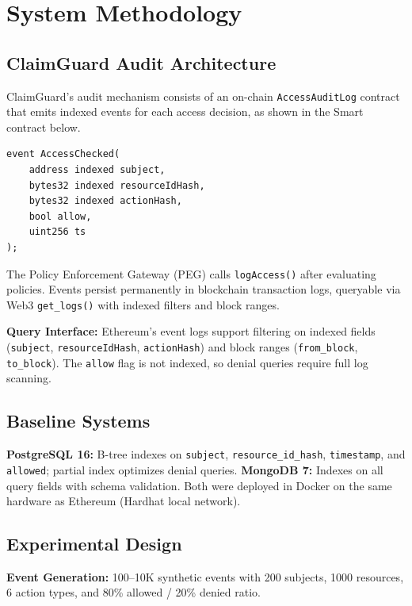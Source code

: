 \documentclass[conference]{IEEEtran}
\begin{document}
\section{System Methodology}

\subsection{ClaimGuard Audit Architecture}

ClaimGuard's audit mechanism consists of an on-chain \texttt{AccessAuditLog} contract that emits indexed events for each access decision, as shown in the Smart contract below.

\begin{lstlisting}[language=Solidity]
event AccessChecked(
    address indexed subject,
    bytes32 indexed resourceIdHash,
    bytes32 indexed actionHash,
    bool allow,
    uint256 ts
);
\end{lstlisting}

The Policy Enforcement Gateway (PEG) calls \texttt{logAccess()} after evaluating policies. Events persist permanently in blockchain transaction logs, queryable via Web3 \texttt{get\_logs()} with indexed filters and block ranges.

\textbf{Query Interface:} Ethereum's event logs support filtering on indexed fields (\texttt{subject}, \texttt{resourceIdHash}, \texttt{actionHash}) and block ranges (\texttt{from\_block}, \texttt{to\_block}). The \texttt{allow} flag is not indexed, so denial queries require full log scanning.

\subsection{Baseline Systems}

\textbf{PostgreSQL 16:} B-tree indexes on \texttt{subject}, \texttt{resource\_id\_hash}, \texttt{timestamp}, and \texttt{allowed}; partial index optimizes denial queries.
\textbf{MongoDB 7:} Indexes on all query fields with schema validation.
Both were deployed in Docker on the same hardware as Ethereum (Hardhat local network).

\subsection{Experimental Design}

\textbf{Event Generation:} 100--10K synthetic events with 200 subjects, 1000 resources, 6 action types, and 80\% allowed / 20\% denied ratio.
\end{document}
